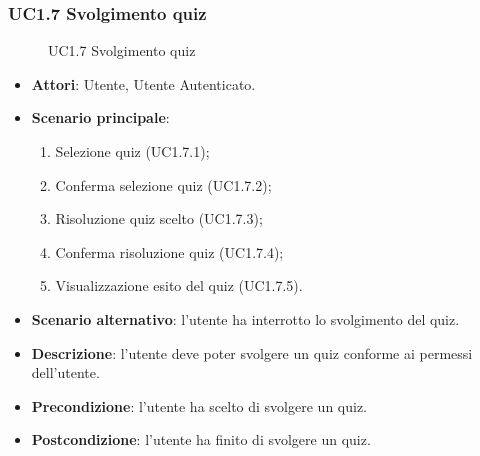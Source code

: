 \subsubsection{UC1.7 Svolgimento quiz}
\begin{figure}[H]
\centering
\noindent{}
\caption{UC1.7 Svolgimento quiz}
\end{figure}
\begin{itemize}
\item \textbf{Attori}: Utente, Utente Autenticato.
\item \textbf{Scenario principale}:
\begin{enumerate}
\item Selezione quiz (UC1.7.1);
\item Conferma selezione quiz (UC1.7.2);
\item Risoluzione quiz scelto (UC1.7.3);
\item Conferma risoluzione quiz (UC1.7.4);
\item Visualizzazione esito del quiz (UC1.7.5).
\end{enumerate}
\item \textbf{Scenario alternativo}: l'utente ha interrotto lo svolgimento del quiz.
\item \textbf{Descrizione}: l'utente deve poter svolgere un quiz conforme ai permessi dell'utente.
\item \textbf{Precondizione}: l'utente ha scelto di svolgere un quiz.
\item \textbf{Postcondizione}: l'utente ha finito di svolgere un quiz.
\end{itemize}

